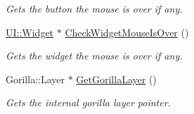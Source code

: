 \begin{DoxyCompactItemize}
\begin{DoxyCompactList}\small\item\em Gets the button the mouse is over if any. \item\end{DoxyCompactList}\item 
\hyperlink{classphys_1_1UI_1_1Widget}{UI::Widget} $\ast$ \hyperlink{classphys_1_1UILayer_ae121ca4d2ebb6fec7351a5c1eaab3dfc}{CheckWidgetMouseIsOver} ()
\begin{DoxyCompactList}\small\item\em Gets the widget the mouse is over if any. \item\end{DoxyCompactList}\item 
Gorilla::Layer $\ast$ \hyperlink{classphys_1_1UILayer_a0f1d04779794d4401714b0d8fa90cab5}{GetGorillaLayer} ()
\begin{DoxyCompactList}\small\item\em Gets the internal gorilla layer pointer. \item\end{DoxyCompactList}\end{DoxyCompactItemize}
